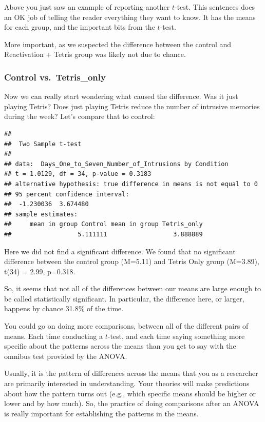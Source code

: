 \documentclass[
]{book}
\begin{document}
Above you just saw an example of reporting another \(t\)-test. This sentences does an OK job of telling the reader everything they want to know. It has the means for each group, and the important bits from the \(t\)-test.

More important, as we suspected the difference between the control and Reactivation + Tetris group was likely not due to chance.

\hypertarget{control-vs.-tetris_only}{%
\subsubsection{Control vs.~Tetris\_only}\label{control-vs.-tetris_only}}

Now we can really start wondering what caused the difference. Was it just playing Tetris? Does just playing Tetris reduce the number of intrusive memories during the week? Let's compare that to control:

\begin{verbatim}
## 
## 	Two Sample t-test
## 
## data:  Days_One_to_Seven_Number_of_Intrusions by Condition
## t = 1.0129, df = 34, p-value = 0.3183
## alternative hypothesis: true difference in means is not equal to 0
## 95 percent confidence interval:
##  -1.230036  3.674480
## sample estimates:
##     mean in group Control mean in group Tetris_only 
##                  5.111111                  3.888889
\end{verbatim}

Here we did not find a significant difference. We found that no significant difference between the control group (M=5.11) and Tetris Only group (M=3.89), t(34) = 2.99, p=0.318.

So, it seems that not all of the differences between our means are large enough to be called statistically significant. In particular, the difference here, or larger, happens by chance 31.8\% of the time.

You could go on doing more comparisons, between all of the different pairs of means. Each time conducting a \(t\)-test, and each time saying something more specific about the patterns across the means than you get to say with the omnibus test provided by the ANOVA.

Usually, it is the pattern of differences across the means that you as a researcher are primarily interested in understanding. Your theories will make predictions about how the pattern turns out (e.g., which specific means should be higher or lower and by how much). So, the practice of doing comparisons after an ANOVA is really important for establishing the patterns in the means.
\end{document}
